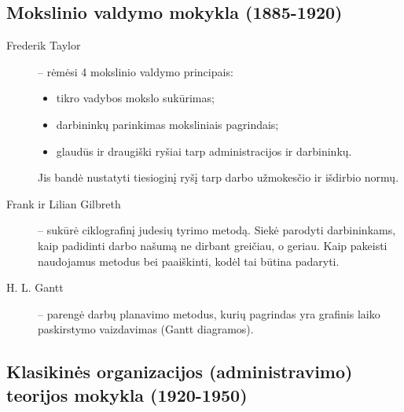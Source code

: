 \subsection{Mokslinio valdymo mokykla (1885-1920)}

\begin{description}
  \item[Frederik Taylor] – rėmėsi 4 mokslinio valdymo principais:
    \begin{itemize}
      \item tikro vadybos mokslo sukūrimas;
      \item darbininkų parinkimas moksliniais pagrindais;
      \item glaudūs ir draugiški ryšiai tarp administracijos ir
        darbininkų.
    \end{itemize}
    Jis bandė nustatyti tiesioginį ryšį tarp darbo užmokesčio ir išdirbio
    normų.
  \item[Frank ir Lilian Gilbreth] – sukūrė ciklografinį judesių tyrimo
    metodą. Siekė parodyti darbininkams, kaip padidinti darbo našumą
    ne dirbant greičiau, o geriau. Kaip pakeisti naudojamus metodus
    bei paaiškinti, kodėl tai būtina padaryti.
  \item[H. L. Gantt] – parengė darbų planavimo metodus, kurių pagrindas
    yra grafinis laiko paskirstymo vaizdavimas (Gantt diagramos).
\end{description}

\subsection{Klasikinės organizacijos (administravimo) teorijos mokykla
(1920-1950)}

